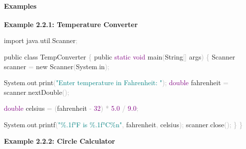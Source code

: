 \documentclass[
  justified,
  openright,
]{tufte-book}
\let\subsubsection\paragraph
\let\paragraph\paragraph
\newcommand{\BuiltInTok}[1]{#1}
\newcommand{\DataTypeTok}[1]{\textcolor{Purple}{#1}}
\newcommand{\DecValTok}[1]{\textcolor{Purple}{#1}}
\newcommand{\FloatTok}[1]{\textcolor{Purple}{#1}}
\newcommand{\FunctionTok}[1]{\textcolor{BrandBlue}{#1}}
\newcommand{\ImportTok}[1]{\textcolor{BrandAccent}{#1}}
\newcommand{\KeywordTok}[1]{\textcolor{BrandBlue}{#1}}
\newcommand{\NormalTok}[1]{#1}
\newcommand{\OperatorTok}[1]{\textcolor{DarkGray}{#1}}
\newcommand{\SpecialCharTok}[1]{\textcolor{Teal}{#1}}
\newcommand{\StringTok}[1]{\textcolor{Teal}{#1}}
\newenvironment{Shaded}{%
  \begin{snugshade}
}{%
  \end{snugshade}
}
\let\subsubsection\paragraph
\let\paragraph\paragraph
\begin{document}
\subsubsection{Examples}\label{examples-2}

\textbf{Example 2.2.1: Temperature Converter}

\begin{Shaded}
\begin{Highlighting}[]
\KeywordTok{import} \ImportTok{java}\OperatorTok{.}\ImportTok{util}\OperatorTok{.}\ImportTok{Scanner}\OperatorTok{;}

\KeywordTok{public} \KeywordTok{class}\NormalTok{ TempConverter }\OperatorTok{\{}
    \KeywordTok{public} \DataTypeTok{static} \DataTypeTok{void} \FunctionTok{main}\OperatorTok{(}\BuiltInTok{String}\OperatorTok{[]}\NormalTok{ args}\OperatorTok{)} \OperatorTok{\{}
        \BuiltInTok{Scanner}\NormalTok{ scanner }\OperatorTok{=} \KeywordTok{new} \BuiltInTok{Scanner}\OperatorTok{(}\BuiltInTok{System}\OperatorTok{.}\FunctionTok{in}\OperatorTok{);}

        \BuiltInTok{System}\OperatorTok{.}\FunctionTok{out}\OperatorTok{.}\FunctionTok{print}\OperatorTok{(}\StringTok{"Enter temperature in Fahrenheit: "}\OperatorTok{);}
        \DataTypeTok{double}\NormalTok{ fahrenheit }\OperatorTok{=}\NormalTok{ scanner}\OperatorTok{.}\FunctionTok{nextDouble}\OperatorTok{();}

        \DataTypeTok{double}\NormalTok{ celsius }\OperatorTok{=} \OperatorTok{(}\NormalTok{fahrenheit }\OperatorTok{{-}} \DecValTok{32}\OperatorTok{)} \OperatorTok{*} \FloatTok{5.0} \OperatorTok{/} \FloatTok{9.0}\OperatorTok{;}

        \BuiltInTok{System}\OperatorTok{.}\FunctionTok{out}\OperatorTok{.}\FunctionTok{printf}\OperatorTok{(}\StringTok{"}\SpecialCharTok{\%.1f}\StringTok{°F is }\SpecialCharTok{\%.1f}\StringTok{°C}\SpecialCharTok{\%n}\StringTok{"}\OperatorTok{,}\NormalTok{ fahrenheit}\OperatorTok{,}\NormalTok{ celsius}\OperatorTok{);}
\NormalTok{        scanner}\OperatorTok{.}\FunctionTok{close}\OperatorTok{();}
    \OperatorTok{\}}
\OperatorTok{\}}
\end{Highlighting}
\end{Shaded}

\textbf{Example 2.2.2: Circle Calculator}
\end{document}
